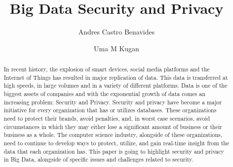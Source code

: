 
\title{Big Data Security and Privacy}

\author{Andres Castro Benavides}

\author{Uma M Kugan}
\renewcommand{\shortauthors}{Uma Kugan, Andres Castro}

\begin{abstract}
In recent history, the explosion of smart devices, social media
platforms and the Internet of Things has resulted in major 
replication of data.  This data is transferred at high speeds, 
in large volumes and in a variety of different platforms. Data is
one of the biggest assets of companies and with the exponential 
growth of data comes an increasing problem: Security and Privacy. 
Security and privacy have become a major initiative for every 
organization that has or utilizes databases.  These organizations
need to protect their brands, avoid penalties, and, in worst case
scenarios, avoid circumstances in which they may either lose a 
significant amount of business or their business as a whole. 
The computer science industry, alongside of these organizations, 
need to continue to develop ways to protect, utilize, and gain 
real-time insight from the data that each organization has. 
This paper is going to highlight security and privacy in Big Data, 
alongside of specific issues and challenges related to security.
\end{abstract}


\maketitle


